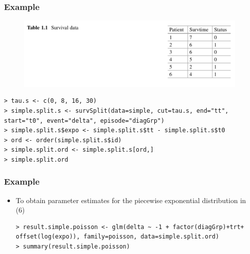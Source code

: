 \documentclass{beamer}
\begin{document}
\pagebreak
\begin{frame}[fragile]
\frametitle{Example}
\begin{figure}[h!]
\includegraphics[scale = .3]{001.png}
\end{figure}
\begin{itemize}
\begin{Verbatim}
> tau.s <- c(0, 8, 16, 30)
> simple.split.s <- survSplit(data=simple, cut=tau.s, end="tt",
start="t0", event="delta", episode="diagGrp")
> simple.split.s$expo <- simple.split.s$tt - simple.split.s$t0
> ord <- order(simple.split.s$id)
> simple.split.ord <- simple.split.s[ord,]
> simple.split.ord
\end{Verbatim}
\end{itemize}
\end{frame}

\pagebreak
\begin{frame}[fragile]
\frametitle{Example}
\begin{itemize}
\begin{Verbatim}
    id   tt   delta   trt   t0   diagGrp   expo 
7    1    6       1     0    0         1      6 
8    2    7       0     0    0         1      7 
9    3    8       0     1    0         1      8 
15   3   10       1     1    8         2      2 
10   4    8       0     0    0         1      8 
16   4   15       1     0    8         2      7 
11   5    8       0     1    0         1      8 
17   5   16       0     1    8         2      8 
23   5   19       0     1   16         3      3 
12   6    8       0     1    0         1      8 
18   6   16       0     1    8         2      8 
24   6   25       1     1   16         3      9 
\end{Verbatim}
\item To obtain parameter estimates for the piecewise exponential distribution in (6)
\begin{Verbatim}
> result.simple.poisson <- glm(delta ~ -1 + factor(diagGrp)+trt+
offset(log(expo)), family=poisson, data=simple.split.ord)
> summary(result.simple.poisson)
\end{Verbatim}
\end{itemize}
\end{frame}
\end{document}
